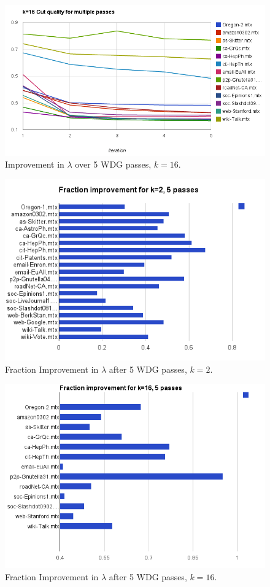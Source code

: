 \begin{figure}[h!]
\centering
\includegraphics[width=0.8\columnwidth] {figures/16partlambda}
\caption[Caption for]{Improvement in $\lambda$ over 5 WDG passes, $k=16$.}
\label{fig:02}
\end{figure}

\begin{figure}[h!]
\centering
\includegraphics[width=0.8\columnwidth] {figures/2partfrac}
\caption[Caption for]{Fraction Improvement in $\lambda$ after 5 WDG passes, $k=2$.}
\label{fig:03}
\end{figure}

\begin{figure}[h!]
\centering
\includegraphics[width=0.8\columnwidth] {figures/16partfrac}
\caption[Caption for]{Fraction Improvement in $\lambda$ after 5 WDG passes, $k=16$.}
\label{fig:04}
\end{figure}

